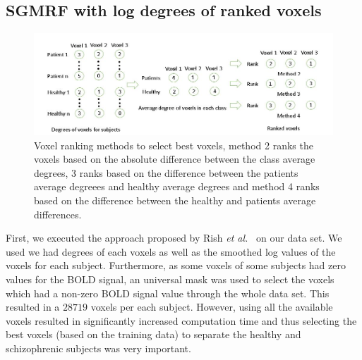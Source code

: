 \documentclass{article} %
\begin{document}
\subsection{SGMRF with log degrees of ranked voxels}
\begin{figure}\label{fig:voxel_rank}
\includegraphics[width=\textwidth]{diagrams/Voxel_ranking.jpg}
\caption{Voxel ranking methods to select best voxels, method 2 ranks the voxels 
based on the absolute difference between the class average degrees,  3 ranks 
based on the difference between the patients average degreees and healthy 
average degrees and method 4 ranks based on the difference between the healthy 
and patients average differences.}
\end{figure}
First, we executed the approach proposed by Rish \emph{et al.}~\cite{Rish_2013} 
on our data set. We used we had degrees of each voxels as well 
as the smoothed log values of the voxels for each subject. Furthermore, as 
some voxels of some subjects had zero values for the BOLD signal, an universal 
mask was used to select the voxels which had a non-zero BOLD signal value 
through the whole data set. This resulted in a $28719$ voxels per each subject. 
However, using all the available voxels resulted in significantly increased 
computation time
and thus selecting the best voxels (based on the training data) to separate 
the healthy and schizophrenic subjects was very important. 
\end{document}
